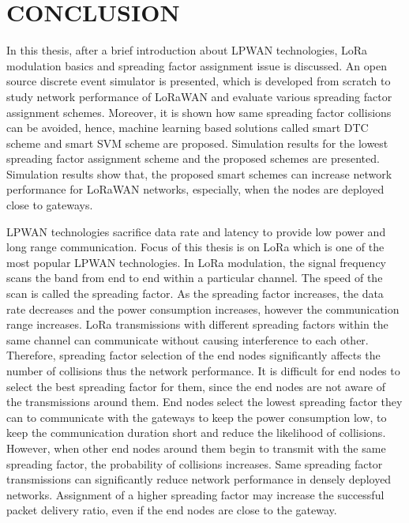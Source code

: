 \chapter{CONCLUSION}\label{ch:conclusion}

In this thesis, after a brief introduction about LPWAN technologies, LoRa modulation basics and spreading factor assignment issue is discussed. An open source discrete event simulator is presented, which is developed from scratch to study network performance of LoRaWAN and evaluate various spreading factor assignment schemes. Moreover, it is shown how same spreading factor collisions can be avoided, hence, machine learning based solutions called smart DTC scheme and smart SVM scheme are proposed. Simulation results for the lowest spreading factor assignment scheme and the proposed schemes are presented. Simulation results show that, the proposed smart schemes can increase network performance for LoRaWAN networks, especially, when the nodes are deployed close to gateways.

LPWAN technologies sacrifice data rate and latency to provide low power and long range communication. Focus of this thesis is on LoRa which is one of the most popular LPWAN technologies. In LoRa modulation, the signal frequency scans the band from end to end within a particular channel. The speed of the scan is called the spreading factor. As the spreading factor increases, the data rate decreases and the power consumption increases, however the communication range increases. LoRa transmissions with different spreading factors within the same channel can communicate without causing interference to each other. Therefore, spreading factor selection of the end nodes significantly affects the number of collisions thus the network performance. It is difficult for end nodes to select the best spreading factor for them, since the end nodes are not aware of the transmissions around them. End nodes select the lowest spreading factor they can to communicate with the gateways to keep the power consumption low, to keep the communication duration short and reduce the likelihood of collisions. However, when other end nodes around them begin to transmit with the same spreading factor, the probability of collisions increases. Same spreading factor transmissions can significantly reduce network performance in densely deployed networks. Assignment of a higher spreading factor may increase the successful packet delivery ratio, even if the end nodes are close to the gateway.

